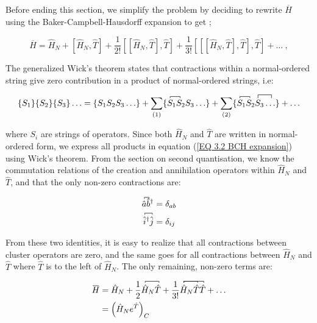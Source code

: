 \documentclass[10pt,twoside]{report}
\begin{document}
	Before ending this section, we simplify the problem by deciding to rewrite $\overbar{H}$ using the Baker-Campbell-Hausdorff expansion to get \cite{ShavittBartlett09};
	
	\begin{equation}
		\overbar{H} = \hat{H}_N + \left[ \hat{H}_N,\hat{T} \right] + \frac{1}{2!}\left[\left[ \hat{H}_N,\hat{T} \right],\hat{T}\right] + \frac{1}{3!}\left[\left[ \left[\hat{H}_N,\hat{T} \right],\hat{T}\right],\hat{T}\right] + \ldots\:,
		\label{EQ 3.2 BCH expansion}
	\end{equation}
	
	The generalized Wick's theorem states that contractions within a normal-ordered string give zero contribution in a product of normal-ordered strings, i.e:
	
	\begin{equation}
		\{S_1\}\{S_2\}\{S_3\}\ldots = \{S_1S_2S_3\ldots\} + \sum_{\text{(1)}}\{\contraction[2pt]{}{S}{{}_1}{S}S_1S_2S_3\ldots\} + \sum_{\text{(2)}}\{\contraction[4pt]{S_1S_2}{S}{{}_3}{\ldots}\contraction[2pt]{}{S}{{}_1}{S}S_1S_2S_3\ldots\} + \ldots
	\end{equation}
	
	\noindent where $S_i$ are strings of operators. Since both $\hat{H}_N$ and $\hat{T}$ are written in normal-ordered form, we express all products in equation (\ref{EQ 3.2 BCH expansion}) using Wick's theorem. From the section on second quantisation, we know the commutation relations of the creation and annihilation operators within $\hat{H}_N$ and $\hat{T}$, and that the only non-zero contractions are:
	
	\begin{align}
		\contraction[2pt]{}{\hat{a}}{}{\hat{b}}\hat{a}\hat{b}^\dagger &= \delta_{ab}\\
		\contraction[2pt]{}{\hat{i}}{{}^\dagger}{\hat{j}}\hat{i}^\dagger\hat{j} &= \delta_{ij}
	\end{align}
	
	From these two identities, it is easy to realize that all contractions between cluster operators are zero, and the same goes for all contractions between $\hat{H}_N$ and $\hat{T}$ where $\hat{T}$ is to the left of $\hat{H}_N$. The only remaining, non-zero terms are:
	
	\begin{align}
		\begin{split}
		\overbar{H} &= \hat{H}_N + \frac{1}{2} \contraction[2pt]{}{\hat{H}}{{}_N}{\hat{T}}\hat{H}_N\hat{T} + \frac{1}{3!}\contraction[2pt]{}{\hat{H}}{{}_N}{\hat{T}}
		\contraction[2pt]{}{\hat{H}}{{}_N\hat{T}}{\hat{T}}\hat{H}_N\hat{T}\hat{T} + \ldots \\
		&= \left(\hat{H}_Ne^{\hat{T}}\right)_C
		\end{split}
	\end{align}
	
\end{document}
